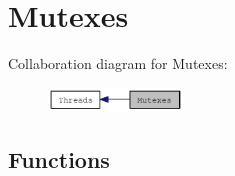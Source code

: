\hypertarget{group__mutex}{
\section{Mutexes}
\label{group__mutex}
}


Collaboration diagram for Mutexes:\nopagebreak
\begin{figure}[H]
\begin{center}
\leavevmode
\includegraphics[width=101pt]{group__mutex}
\end{center}
\end{figure}
\subsection*{Functions}
